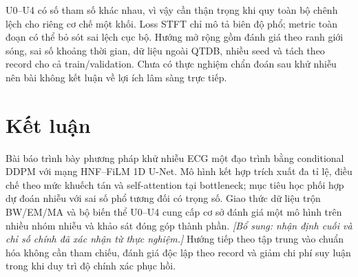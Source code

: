 \documentclass[conference]{IEEEtran}
\newcommand{\draftnote}[1]{\textit{[Bổ sung: #1]}}
\begin{document}
U0--U4 có số tham số khác nhau, vì vậy cần thận trọng khi quy toàn bộ chênh lệch cho riêng cơ chế một khối. Loss STFT chỉ mô tả biên độ phổ; metric toàn đoạn có thể bỏ sót sai lệch cục bộ. Hướng mở rộng gồm đánh giá theo ranh giới sóng, sai số khoảng thời gian, dữ liệu ngoài QTDB, nhiều seed và tách theo record cho cả train/validation. Chưa có thực nghiệm chẩn đoán sau khử nhiễu nên bài không kết luận về lợi ích lâm sàng trực tiếp.

\section{Kết luận}
Bài báo trình bày phương pháp khử nhiễu ECG một đạo trình bằng conditional DDPM với mạng HNF--FiLM 1D U-Net. Mô hình kết hợp trích xuất đa tỉ lệ, điều chế theo mức khuếch tán và self-attention tại bottleneck; mục tiêu học phối hợp dự đoán nhiễu với sai số phổ tương đối có trọng số. Giao thức dữ liệu trộn BW/EM/MA và bộ biến thể U0--U4 cung cấp cơ sở đánh giá một mô hình trên nhiều nhóm nhiễu và khảo sát đóng góp thành phần. \draftnote{nhận định cuối và chỉ số chính đã xác nhận từ thực nghiệm.} Hướng tiếp theo tập trung vào chuẩn hóa không cần tham chiếu, đánh giá độc lập theo record và giảm chi phí suy luận trong khi duy trì độ chính xác phục hồi.
\end{document}
